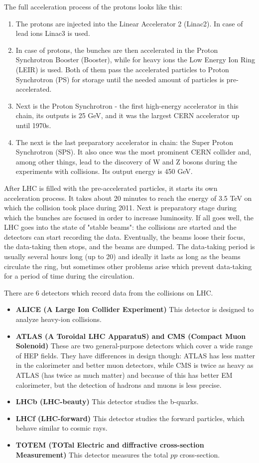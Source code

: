 The full acceleration process of the protons looks like this:

\begin{enumerate}
\item The protons are injected into the Linear Accelerator 2 (Linac2). In case of lead ions Linac3 is used.
\item In case of protons, the bunches are then accelerated in the Proton Synchrotron Booster (Booster), while for heavy ions the Low Energy Ion Ring (LEIR) is used. Both of them pass the accelerated particles to Proton Synchrotron (PS) for storage until the needed amount of particles is pre-accelerated.
\item Next is the Proton Synchrotron - the first high-energy accelerator in this chain, its outputs is 25 GeV, and it was the largest CERN accelerator up until 1970s.
\item The next is the last preparatory accelerator in chain: the Super Proton Synchrotron (SPS). It also once was the most prominent CERN collider and, among other things, lead to the discovery of W and Z bosons during the experiments with  collisions. Its output energy is 450 GeV.
\end{enumerate}

After LHC is filled with the pre-accelerated particles, it starts its own acceleration process. It takes about 20 minutes to reach the energy of 3.5 TeV on which the collision took place during 2011. Next is preparatory stage during which the bunches are focused in order to increase luminosity. If all goes well, the LHC goes into the state of "stable beams": the collisions are started and the detectors can start recording the data. Eventually, the beams loose their focus, the data-taking then stops, and the beams are dumped. The data-taking period is usually several hours long (up to 20) and ideally it lasts as long as the beams circulate the ring, but sometimes other problems arise which prevent data-taking for a period of time during the circulation.

There are 6 detectors which record data from the collisions on LHC.
\begin{itemize}
\item {\bfseries ALICE (A Large Ion Collider Experiment)} This detector is designed to analyze heavy-ion collisions.
\item {\bfseries ATLAS (A Toroidal LHC ApparatuS) and CMS (Compact Muon Solenoid)} These are two general-purpose detectors which cover a wide range of HEP fields. They have differences in design though: ATLAS has less matter in the calorimeter and better muon detectors, while CMS is twice as heavy as ATLAS (has twice as much matter) and because of this has better EM calorimeter, but the detection of hadrons and muons is less precise.
\item {\bfseries LHCb (LHC-beauty)} This detector studies the b-quarks.
\item {\bfseries LHCf (LHC-forward)} This detector studies the forward particles, which behave similar to cosmic rays.
\item {\bfseries TOTEM (TOTal Electric and diffractive cross-section Measurement)} This detector measures the total $pp$ cross-section.
\end{itemize}

